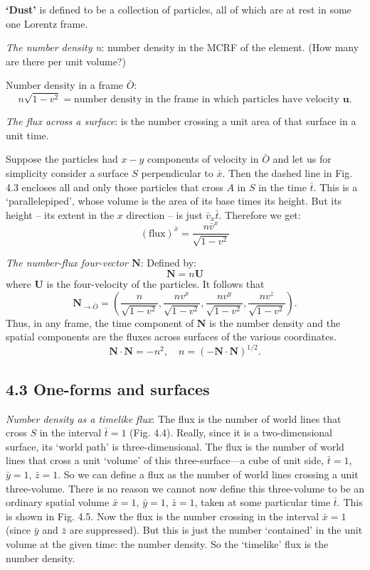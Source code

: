 \documentclass[12pt]{book}
\begin{document}
    \textbf{‘Dust’} is defined to be a collection of particles, all of which are at rest in some one Lorentz frame.

    \textit{The number density n}: number density in the MCRF of the element. (How many are there per unit volume?)
    
    Number density in a frame \(\bar{O}\):
    \[
    n \sqrt{1 - v^2} = \text{number density in the frame in which particles have velocity } \mathbf{u}.
    \tag{4.2}
    \]

    \textit{The flux across a surface}: is the number crossing a unit area of that surface in a unit time. 

    Suppose the particles had $x-y$ components of velocity in \(\bar{O}\) and let us for simplicity consider a surface $S$ perpendicular to $\bar{x}$. Then the dashed line in Fig. 4.3 encloses all and only those particles that cross \(A\) in \(S\) in the time \(\bar{t}\). This is a ‘parallelepiped’, whose volume is the area of its base times its height. But its height – its extent in the \(x\) direction – is just \(\bar{v}_x \bar{t}\). Therefore we get:
    \[
    (\text{flux})^{\bar{x}} = \frac{n \bar{v}^x }{\sqrt{1 - v^2}}
    \tag{4.3}
    \]

    \textit{The number-flux four-vector $\mathbf{N}$}: 
    Defined by:
    \[
        \mathbf{N}=n\mathbf{U} \tag{4.4}
    \]
    where \(\mathbf{U}\) is the four-velocity of the particles. It follows that
    \[
    \mathbf{N}_{\rightarrow \bar{O}} =
    \left(
    \frac{n}{\sqrt{1 - v^2}},
    \frac{n v^x}{\sqrt{1 - v^2}},
    \frac{n v^y}{\sqrt{1 - v^2}},
    \frac{n v^z}{\sqrt{1 - v^2}}
    \right).
    \tag{4.5}
    \]
    Thus, in any frame, the time component of $\mathbf{N}$ is the number density and the spatial components are the fluxes across surfaces of the various coordinates.
    \[
    \mathbf{N} \cdot \mathbf{N} = -n^2, \quad n = \left(-\mathbf{N} \cdot \mathbf{N}\right)^{1/2}.     \tag{4.6}
    \]

    \subsection{4.3 One-forms and surfaces}

    \textit{Number density as a timelike flux}: 
    The flux is the number of world lines that cross \(S\) in the interval \(\bar{t} = 1\) (Fig. 4.4). Really, since it is a two-dimensional surface, its ‘world path’ is three-dimensional. The flux is the number of world lines that cross a unit ‘volume’ of this three-surface—a cube of unit side, \(\bar{t} = 1\), \(\bar{y} = 1\), \(\bar{z} = 1\). So we can define a flux as the number of world lines crossing a unit three-volume. There is no reason we cannot now define this three-volume to be an ordinary spatial volume \(\bar{x} = 1\), \(\bar{y} = 1\), \(\bar{z} = 1\), taken at some particular time \(\bar{t}\). This is shown in Fig. 4.5. Now the flux is the number crossing in the interval \(\bar{x} = 1\) (since \(\bar{y}\) and \(\bar{z}\) are suppressed). But this is just the number ‘contained’ in the unit volume at the given time: the number density. So the ‘timelike’ flux is the number density.
\end{document}
